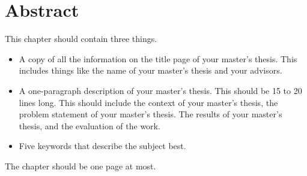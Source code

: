 \chapter*{Abstract}

This chapter should contain three things.

\begin{itemize}
    \item A copy of all the information on the title page of your master's thesis. This includes things like the name of your master's thesis and your advisors.
    \item A one-paragraph description of your master's thesis. This should be 15 to 20 lines long. This should include the context of your master's thesis, the problem statement of your master's thesis. The results of your master's thesis, and the evaluation of the work.
    \item Five keywords that describe the subject best.
\end{itemize}

The chapter should be one page at most.

